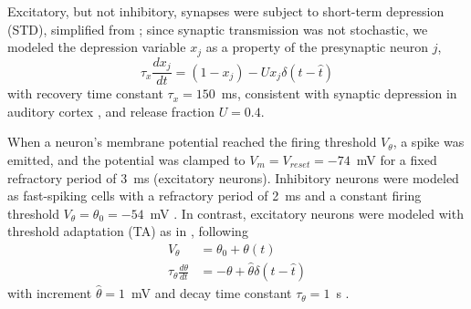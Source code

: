 \documentclass[9pt,lineno,onehalfspacing]{elife}
\begin{document}
Excitatory, but not inhibitory, synapses were subject to short-term depression (STD), simplified from \cite{Tsodyks1997-qt}; since synaptic transmission was not stochastic, we modeled the depression variable $x_j$ as a property of the presynaptic neuron $j$,
\begin{equation}
    \tau_x \frac{dx_j}{dt} = (1-x_j) - U x_j \delta(t - \hat{t}) \label{eq:xsyn}
\end{equation}
with recovery time constant $\tau_x = 150$~ms, consistent with synaptic depression in auditory cortex \citep{David2013-cw,Pennington2020-ua}, and release fraction $U = 0.4$.

When a neuron's membrane potential reached the firing threshold $V_\theta$, a spike was emitted, and the potential was clamped to $V_m = V_{reset} = -74$~mV for a fixed refractory period of 3~ms (excitatory neurons). Inhibitory neurons were modeled as fast-spiking cells with a refractory period of 2~ms and a constant firing threshold $V_\theta = \theta_0 = -54$~mV \citep{Mensi2012-au}. In contrast, excitatory neurons were modeled with threshold adaptation (TA) as in \cite{Teeter2018-iz}, following
\begin{align}
    V_\theta &= \theta_0 + \theta(t) \nonumber \\
    \tau_{\theta} \frac{d\theta}{dt} &= -\theta + \hat{\theta} \delta(t - \hat{t}) \label{eq:TA}
\end{align}
with increment $\hat{\theta} = 1$~mV and decay time constant $\tau_{\theta} = 1$~s \citep{Henze2001-xd, Pozzorini2015-ei}.
\end{document}
